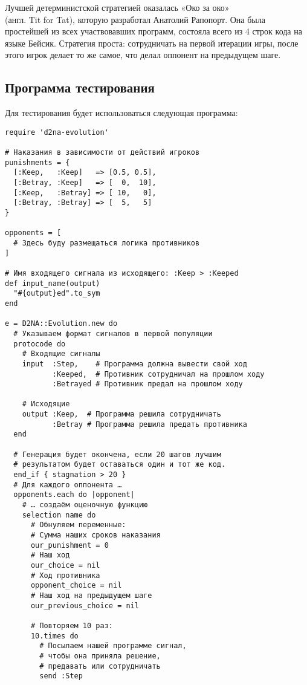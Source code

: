 \documentclass[utf8,a5paper,portrait,10pt,twoside]{eskdtext}
\begin{document}
Лучшей детерминистской стратегией оказалась «Око за око»\\ (англ. Tit for Tat), 
которую разработал Анатолий Рапопорт. Она была простейшей из всех участвовавших
программ, состояла всего из 4 строк кода на языке Бейсик. Стратегия проста:
сотрудничать на первой итерации игры, после этого игрок делает то же самое, что 
делал оппонент на предыдущем шаге.

\newpage
\subsection{Программа тестирования}

Для тестирования будет использоваться следующая программа:

\begin{verbatim}
require 'd2na-evolution'

# Наказания в зависимости от действий игроков
punishments = {
  [:Keep,   :Keep]   => [0.5, 0.5],
  [:Betray, :Keep]   => [  0,  10],
  [:Keep,   :Betray] => [ 10,   0],
  [:Betray, :Betray] => [  5,   5]
}

opponents = [
  # Здесь буду размещаться логика противников
]

# Имя входящего сигнала из исходящего: :Keep > :Keeped
def input_name(output)
  "#{output}ed".to_sym
end

e = D2NA::Evolution.new do
  # Указываем формат сигналов в первой популяции
  protocode do
    # Входящие сигналы
    input  :Step,    # Программа должна вывести свой ход
           :Keeped,  # Противник сотрудничал на прошлом ходу
           :Betrayed # Противник предал на прошлом ходу
    
    # Исходящие
    output :Keep,  # Программа решила сотрудничать
           :Betray # Программа решила предать противника
  end
  
  # Генерация будет окончена, если 20 шагов лучшим
  # результатом будет оставаться один и тот же код.
  end_if { stagnation > 20 }
  # Для каждого оппонента …
  opponents.each do |opponent|
    # … создаём оценочную функцию
    selection name do
      # Обнуляем переменные:
      # Сумма наших сроков наказания
      our_punishment = 0
      # Наш ход
      our_choice = nil
      # Ход противника
      opponent_choice = nil
      # Наш ход на предыдущем шаге
      our_previous_choice = nil
      
      # Повторяем 10 раз:
      10.times do
        # Посылаем нашей программе сигнал,
        # чтобы она приняла решение,
        # предавать или сотрудничать
        send :Step
        

\end{verbatim}
\end{document}
